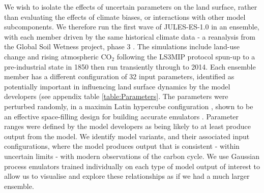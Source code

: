 \documentclass[gmd, manuscript]{copernicus}
\begin{document}
We wish to isolate the effects of uncertain parameters on the land surface, rather than evaluating the effects of climate biases, or interactions with other model subcomponents. We therefore run the first wave of JULES-ES-1.0 in an ensemble, with each member driven by the same historical climate data - a reanalysis from the Global Soil Wetness project, phase 3 \citep{kim2017global}. The simulations include land-use change and rising atmospheric CO$_2$ following the LS3MIP protocol \citep{gmd-9-2809-2016} spun-up to a pre-industrial state in 1850 then run transiently through to 2014. Each ensemble member has a different configuration of 32 input parameters, identified as potentially important in influencing land surface dynamics by the model developers (see appendix table \ref{table:Parameters}. The parameters were perturbed randomly, in a maximin Latin hypercube configuration \citep{mckay1979comparison}, shown to be an effective space-filling design for building accurate emulators \citep{urban2010comparison}. Parameter ranges were defined by the model developers as being likely to at least produce output from the model. We identify model variants, and their associated input configurations, where the model produces output that is consistent - within uncertain limits - with modern observations of the carbon cycle. We use Gaussian process emulators trained individually on each type of model output of interest to allow us to visualise and explore these relationships as if we had a much larger ensemble.



\end{document}

